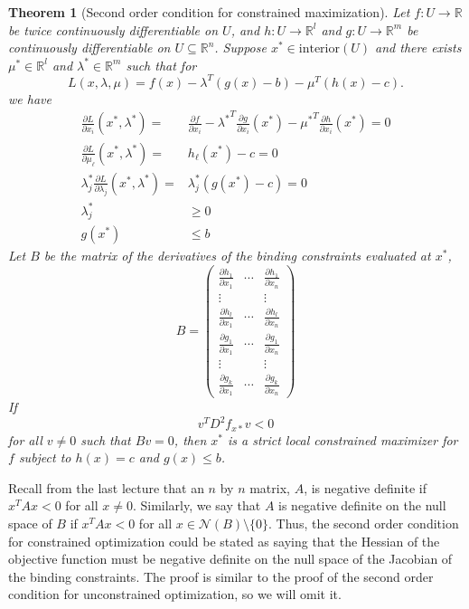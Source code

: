 \documentclass[12pt,reqno]{amsart}
\newtheorem{theorem}{Theorem}[section]
\theoremstyle{definition}
\def\R{\mathbb{R}}
\renewcommand{\to}{{\rightarrow}}
\begin{document}
\begin{theorem}[Second order condition for constrained maximization]
  Let $f:U \to \R$ be twice continuously
  differentiable on $U$, and $h:U \to \R^l$ and $g: U \to \R^m$ be
  continuously differentiable on $U \subseteq \R^n$. Suppose $x^* \in    
  \mathrm{interior}(U)$ and there exists
  $\mu^* \in \R^l$ and $\lambda^* \in \R^m$ such that for 
  \[ L(x,\lambda,\mu) = f(x) - \lambda^T (g(x) - b) - \mu^T(h(x) - c). \]
  we have
  \begin{align*}
    \frac{\partial L}{\partial x_i}(x^*,\lambda^*) = & \frac{\partial
      f}{\partial x_i} - {\lambda^*}^T \frac{\partial g}{\partial
      x_i}(x^*) - {\mu^*}^T \frac{\partial h}{\partial x_i}(x^*)= 0 \\
    \frac{\partial L}{\partial \mu_\ell}(x^*,\lambda^*) = & h_\ell(x^*) - c = 0 \\
    \lambda_j^* \frac{\partial L}{\partial \lambda_j}(x^*,\lambda^*) =
    & \lambda_j^* \left(g(x^*) - c \right)= 0 \\
    \lambda_j^* & \geq 0 \\
    g(x^*) & \leq b
  \end{align*}
  Let $B$ be the matrix of the derivatives of the binding constraints
  evaluated at $x^*$,
  \[ B = \begin{pmatrix} 
    \frac{\partial h_1}{\partial x_1} &  \cdots &\frac{\partial
      h_1}{\partial x_n}  \\
    \vdots & & \vdots \\
    \frac{\partial h_l}{\partial x_1} &  \cdots &\frac{\partial
      h_l}{\partial x_n}  \\    
    \frac{\partial g_1}{\partial x_1} &  \cdots &\frac{\partial
      g_1}{\partial x_n}  \\ 
    \vdots & & \vdots \\
    \frac{\partial g_k}{\partial x_1} &  \cdots &\frac{\partial
      g_k}{\partial x_n}  
  \end{pmatrix}
  \]
  If 
  \[ v^T D^2 f_{x*} v < 0 \]
  for all $v \neq 0$ such that $B v = 0$, then $x^*$ is a strict
  local constrained maximizer for $f$ subject to $h(x) = c$ and $g(x)
  \leq b$. 
\end{theorem}
Recall from the last lecture that an $n$ by $n$ matrix, $A$, is
negative definite if $x^T A x < 0$ for all $x \neq 0$. Similarly, we
say that $A$ is negative definite on the null space of $B$ if $x^T A x
< 0$ for all $x \in \mathcal{N}(B) \setminus\{0\}$. Thus, the second
order condition for constrained optimization could be stated as saying
that the Hessian of the objective function must be negative definite
on the null space of the Jacobian of the binding constraints. The
proof is similar to the proof of the second order condition for
unconstrained optimization, so we will omit it. 
\end{document}
